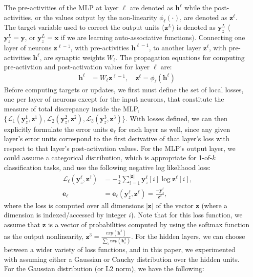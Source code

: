 \documentclass[letterpaper]{article} %
\begin{document}
The pre-activities of the MLP at layer $\ell$ are denoted as $\mathbf{h}^\ell$ while the post-activities, or the values output by the non-linearity $\phi_\ell(\cdot)$, are denoted as $\mathbf{z}^\ell$. The target variable used to correct the output units ($\mathbf{z}^L$) is denoted as $\mathbf{y}^L_z$ ($\mathbf{y}^L_z = \mathbf{y}$, or $\mathbf{y}^L_z = \mathbf{x}$ if we are learning auto-associative functions). Connecting one layer of neurons $\mathbf{z}^{\ell-1}$, with pre-activities $\mathbf{h}^{\ell-1}$, to another layer $\mathbf{z}^{\ell}$, with pre-activities $\mathbf{h}^{\ell}$, are synaptic weights $W_\ell$. The  propagation equations for computing pre-activtion and post-activation values for layer $\ell$ are:
\begin{align}
\mathbf{h}^\ell &= W_\ell \mathbf{z}^{\ell-1}, \quad \mathbf{z}^\ell = \phi_\ell(\mathbf{h}^\ell) \label{eqn:fprop}
\end{align}
Before computing targets or updates, we first must define the set of local losses, one per layer of neurons except for the input neurons, that constitute the measure of total discrepancy inside the MLP, $\{ \mathcal{L}_1(\mathbf{y}^1_z,\mathbf{z}^1), \mathcal{L}_2(\mathbf{y}^2_z,\mathbf{z}^2), \mathcal{L}_3(\mathbf{y}^3_z,\mathbf{z}^3) \}$. With losses defined, we can then explicitly formulate the error units $\mathbf{e}_\ell$ for each layer as well, since any given layer's error units correspond to the first derivative of that layer's loss with respect to that layer's post-activation values. For the MLP's output layer, we could assume a categorical distribution, which is appropriate for 1-of-$k$ classification tasks, and use the following negative log likelihood loss:
\begin{align}
\mathcal{L}_\ell(\mathbf{y}^\ell_z, \mathbf{z}^\ell) &= -\frac{1}{2} \sum^{|\mathbf{z}|}_{i=1} \mathbf{y}^\ell_z[i] \log \mathbf{z}^\ell[i]  \mbox{,} \nonumber \\
\mathbf{e}_\ell &= \mathbf{e}_\ell(\mathbf{y}^\ell_z, \mathbf{z}^\ell) = \frac{-\mathbf{y}^\ell_z}{\mathbf{z}^\ell} \mbox{,} \label{cat_loss}
\end{align}
where the loss is computed over all dimensions $|\mathbf{z}|$ of the vector $\mathbf{z}$ (where a dimension is indexed/accessed by integer $i$). Note that for this loss function, we assume that $\mathbf{z}$ is a vector of probabilities computed by using the softmax function as the output nonlinearity, $\mathbf{z}^3 = \frac{exp(\mathbf{h}^3)}{\sum_i exp(\mathbf{h}^3_i)}$. For the hidden layers, we can choose between a wider variety of loss functions, and in this paper, we experimented with assuming either a Gaussian or Cauchy distribution over the hidden units. For the Gaussian distribution (or L2 norm), we have the following:
\end{document}
